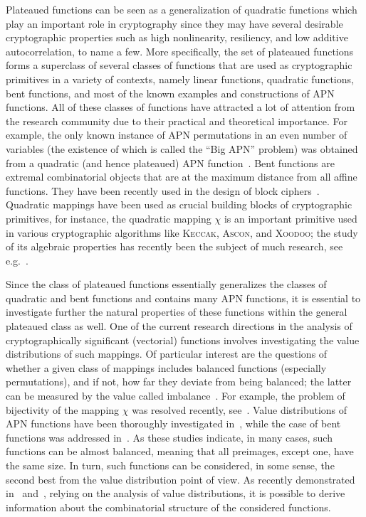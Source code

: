 \documentclass[11pt]{article}
\theoremstyle{plain}
\theoremstyle{definition}
\numberwithin{theorem}{section}
\numberwithin{equation}{section}
\numberwithin{table}{section}
\numberwithin{figure}{section}
\begin{document}
{Plateaued functions can be seen as a generalization of quadratic functions which play an important role in cryptography since they may have several desirable cryptographic properties such as high nonlinearity, resiliency, and low additive autocorrelation, to name a few.  More specifically, the set of plateaued functions forms a superclass of several classes of functions that are used as cryptographic primitives in a variety of contexts, namely linear functions, quadratic functions, bent functions, and most of the known examples and constructions of APN functions. All of these classes of functions have attracted a lot of attention from the research community due to their practical and theoretical importance. For example, the only known instance of APN permutations in an even number of variables (the existence of which is called the ``Big APN'' problem) was obtained from a quadratic (and hence plateaued) APN function~\cite{APNPermutation}. Bent functions are extremal combinatorial objects that are at the maximum distance from all affine functions. They have been recently used in the design of block ciphers~\cite{Wiemer20}. Quadratic mappings have been used as crucial building blocks of cryptographic primitives, for instance, the quadratic mapping $\chi$ is an important primitive used in various cryptographic algorithms like \textsc{Keccak}, \textsc{Ascon}, and \textsc{Xoodoo}; the study of its algebraic properties has recently been the subject of much research, see e.g.~\cite{KK2024,Schoone2024}.

Since the class of plateaued functions essentially generalizes the classes of quadratic and bent functions and contains many APN functions, it is essential to investigate further the natural properties of these functions within the general plateaued class as well. One of the current research directions in the analysis of cryptographically significant (vectorial) functions involves investigating the value distributions of such mappings. Of particular interest are the questions of whether a given class of mappings includes balanced functions (especially permutations), and if not, how far they deviate from being balanced; the latter can be measured by the value called imbalance~\cite{carlet2007nonlinearities}. For example, the problem of bijectivity of the mapping $\chi$ was resolved recently, see~\cite{AMG2024,Schoone2024}.  Value distributions of APN functions have been thoroughly investigated in~\cite{Koelsch2023}, while the case of bent functions was addressed in~\cite{KoelschPolujan2024}. As these studies indicate, in many cases, such functions can be almost balanced, meaning that all preimages, except one, have the same size. In turn, such functions can be considered, in some sense, the second best from the value distribution point of view. As recently demonstrated in~\cite{Koelsch2023,KoelschPolujan2024} and~\cite{AycyaWilfriedIEEE2025}, relying on the analysis of value distributions, it is possible to derive information about the combinatorial structure of the considered functions. 

}
\end{document}
